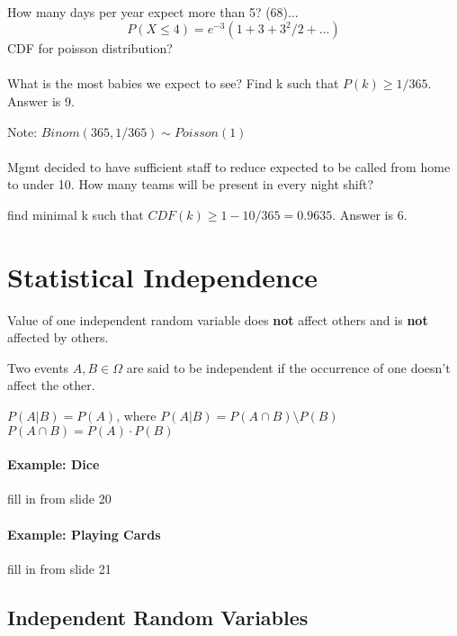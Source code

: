 \documentclass[a4paper]{article}
\begin{document}
\paragraph{}
How many days per year expect more than 5? (68)...
\[P(X\le4)=e^{-3}(1+3+3^2/2+...)\]
CDF for poisson distribution?

\paragraph{}
What is the most babies we expect to see? Find k such that $P(k)\ge1/365$. Answer is 9.

Note: $Binom(365, 1/365)\sim Poisson(1)$

\paragraph{}
Mgmt decided to have sufficient staff to reduce expected to be called from home to under 10. How many teams will be present in every night shift?

find minimal k such that $CDF(k)\ge1-10/365=0.9635$. Answer is 6.

\section{Statistical Independence}

Value of one independent random variable does {\bf not} affect others and is {\bf not} affected by others.

Two events $A,B\in\Omega$ are said to be independent if the occurrence of one doesn't affect the other.

$P(A|B)=P(A)$, where $P(A|B)=P(A\cap B)\setminus P(B)$
$P(A\cap B)=P(A)\cdot P(B)$

\paragraph{Example: Dice}
fill in from slide 20

\paragraph{Example: Playing Cards}

fill in from slide 21

\subsection{Independent Random Variables}
\end{document}
